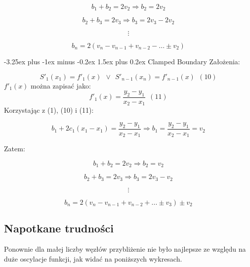 \documentclass{article}
\makeatletter
\renewcommand{\paragraph}{\@startsection{paragraph}{4}{0ex}%
   {-3.25ex plus -1ex minus -0.2ex}%
   {1.5ex plus 0.2ex}%
   {\normalfont\normalsize\bfseries}}
\makeatother
\begin{document}
\[b_1+b_2 = 2v_2 \Rightarrow b_2 = 2v_2\]

\[b_2 + b_3 = 2v_3 \Rightarrow b_3 = 2v_3-2v_2\]

\[\vdots\]

\[b_n = 2(v_n-v_{n-1}+v_{n-2}-...\pm v_2)\]

\paragraph{Clamped Boundary}
\noindent
Założenia:

\[S'_1(x_1) = f'_1(x) \ \ \vee \ \ S'_{n-1}(x_n) = f'_{n-1}(x) \ \ (10)\]
\noindent
\(f'_1(x)\) można zapisać jako:
\[f'_1(x) = \frac{y_2-y_1}{x_2-x_1} \ \ (11)\]
\noindent
Korzystając z (1), (10) i (11):

\[b_1 + 2c_1(x_1 - x_1) = \frac{y_2 - y_1}{x_2-x_1} \Rightarrow  b_1 = \frac{y_2 - y_1}{x_2-x_1} = v_2\]

\bigbreak
\noindent
Zatem:

\[b_1 + b_2 = 2v_2 \Rightarrow b_2 = v_2\]

\[b_2 + b_3 = 2v_3 \Rightarrow b_3 = 2v_3 - v_2 \]

\[\vdots \]

\[b_n = 2(v_n-v_{n-1}+v_{n-2}+...\pm v_3) \pm v_2\]

\newpage

\subsection{Napotkane trudności}

Ponownie dla małej liczby węzłów przybliżenie nie było najlepsze ze względu na duże oscylacje funkcji, jak widać na poniższych wykresach.
\end{document}
